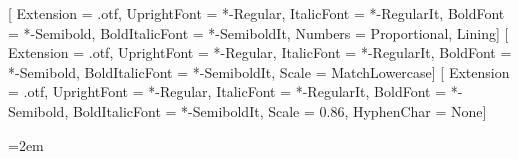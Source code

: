 %
%
%


\usepackage{etoolbox}
\usepackage{fontspec}
\usepackage[shorthands=off,lithuanian,british]{babel}
\usepackage{microtype}
\usepackage[colon=literal]{unicode-math}

\setmainfont{SourceSerif4}[
  Extension      = .otf,
  UprightFont    = *-Regular,
  ItalicFont     = *-RegularIt,
  BoldFont       = *-Semibold,
  BoldItalicFont = *-SemiboldIt,
  Numbers        = {Proportional, Lining}]
\setsansfont{SourceSans3}[
  Extension      = .otf,
  UprightFont    = *-Regular,
  ItalicFont     = *-RegularIt,
  BoldFont       = *-Semibold,
  BoldItalicFont = *-SemiboldIt,
  Scale          = MatchLowercase]
\setmonofont{SourceCodePro}[
  Extension      = .otf,
  UprightFont    = *-Regular,
  ItalicFont     = *-RegularIt,
  BoldFont       = *-Semibold,
  BoldItalicFont = *-SemiboldIt,
  Scale          = 0.86,
  HyphenChar     = None]

\usepackage[a4paper, left=30mm, right=30mm, top=27mm, bottom=30mm,
            headheight=14pt, headsep=9mm, footskip=12mm]{geometry}
\usepackage{setspace}
\raggedbottom
\emergencystretch=2em


